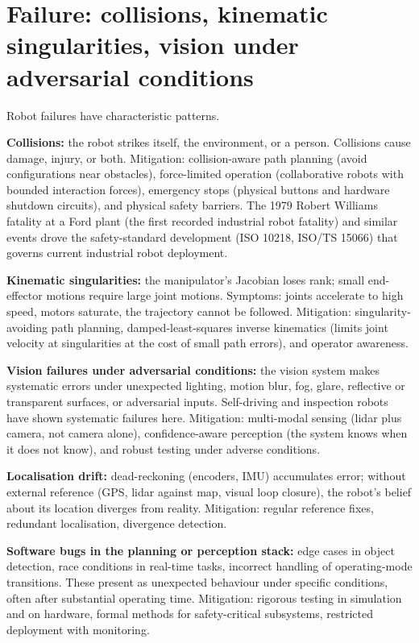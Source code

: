 \section{Failure: collisions, kinematic singularities, vision under adversarial conditions}

Robot failures have characteristic patterns.

\textbf{Collisions:} the robot strikes itself, the environment, or a person. Collisions cause damage, injury, or both. Mitigation: collision-aware path planning (avoid configurations near obstacles), force-limited operation (collaborative robots with bounded interaction forces), emergency stops (physical buttons and hardware shutdown circuits), and physical safety barriers. The 1979 Robert Williams fatality at a Ford plant (the first recorded industrial robot fatality) and similar events drove the safety-standard development (ISO 10218, ISO/TS 15066) that governs current industrial robot deployment.

\textbf{Kinematic singularities:} the manipulator's Jacobian loses rank; small end-effector motions require large joint motions. Symptoms: joints accelerate to high speed, motors saturate, the trajectory cannot be followed. Mitigation: singularity-avoiding path planning, damped-least-squares inverse kinematics (limits joint velocity at singularities at the cost of small path errors), and operator awareness.

\textbf{Vision failures under adversarial conditions:} the vision system makes systematic errors under unexpected lighting, motion blur, fog, glare, reflective or transparent surfaces, or adversarial inputs. Self-driving and inspection robots have shown systematic failures here. Mitigation: multi-modal sensing (lidar plus camera, not camera alone), confidence-aware perception (the system knows when it does not know), and robust testing under adverse conditions.

\textbf{Localisation drift:} dead-reckoning (encoders, IMU) accumulates error; without external reference (GPS, lidar against map, visual loop closure), the robot's belief about its location diverges from reality. Mitigation: regular reference fixes, redundant localisation, divergence detection.

\textbf{Software bugs in the planning or perception stack:} edge cases in object detection, race conditions in real-time tasks, incorrect handling of operating-mode transitions. These present as unexpected behaviour under specific conditions, often after substantial operating time. Mitigation: rigorous testing in simulation and on hardware, formal methods for safety-critical subsystems, restricted deployment with monitoring.

